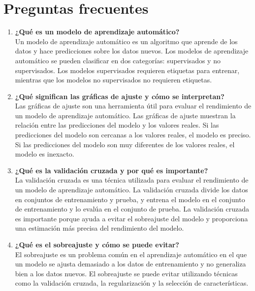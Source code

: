 
\chapter{\textcolor{azulescom}{Preguntas frecuentes}}

\begin{enumerate}
\item \textbf{¿Qué es un modelo de aprendizaje automático?} \\
Un modelo de aprendizaje automático es un algoritmo que aprende de los datos y hace predicciones sobre los datos nuevos. Los modelos de aprendizaje automático se pueden clasificar en dos categorías: supervisados y no supervisados. Los modelos supervisados requieren etiquetas para entrenar, mientras que los modelos no supervisados no requieren etiquetas.
\item \textbf{¿Qué significan las gráficas de ajuste y cómo se interpretan?} \\
Las gráficas de ajuste son una herramienta útil para evaluar el rendimiento de un modelo de aprendizaje automático. Las gráficas de ajuste muestran la relación entre las predicciones del modelo y los valores reales. Si las predicciones del modelo son cercanas a los valores reales, el modelo es preciso. Si las predicciones del modelo son muy diferentes de los valores reales, el modelo es inexacto.
\item \textbf{¿Qué es la validación cruzada y por qué es importante?} \\
La validación cruzada es una técnica utilizada para evaluar el rendimiento de un modelo de aprendizaje automático. La validación cruzada divide los datos en conjuntos de entrenamiento y prueba, y entrena el modelo en el conjunto de entrenamiento y lo evalúa en el conjunto de prueba. La validación cruzada es importante porque ayuda a evitar el sobreajuste del modelo y proporciona una estimación más precisa del rendimiento del modelo.
\item \textbf{¿Qué es el sobreajuste y cómo se puede evitar?} \\
El sobreajuste es un problema común en el aprendizaje automático en el que un modelo se ajusta demasiado a los datos de entrenamiento y no generaliza bien a los datos nuevos. El sobreajuste se puede evitar utilizando técnicas como la validación cruzada, la regularización y la selección de características.
\end{enumerate}



